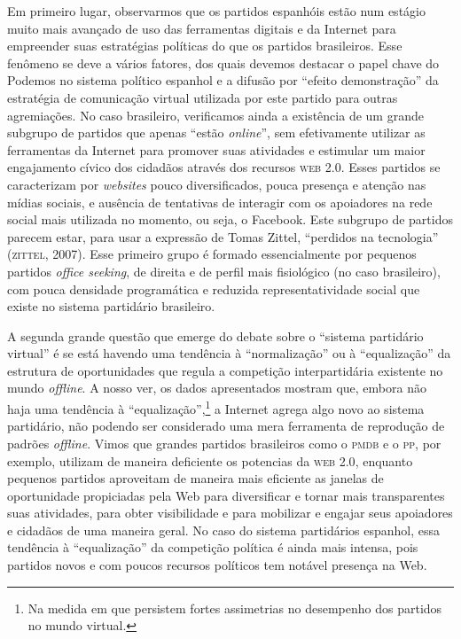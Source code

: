 Em primeiro lugar, observarmos que os partidos espanhóis estão num
estágio muito mais avançado de uso das ferramentas digitais e da
Internet para empreender suas estratégias políticas do que os partidos
brasileiros. Esse fenômeno se deve a vários fatores, dos quais devemos
destacar o papel chave do Podemos no sistema político espanhol e
a difusão por ``efeito demonstração'' da estratégia de comunicação
virtual utilizada por este partido para outras agremiações. No caso
brasileiro, verificamos ainda a existência de um grande subgrupo de
partidos que apenas ``estão \textit{online}'', sem efetivamente utilizar as
ferramentas da Internet para promover suas atividades e estimular um
maior engajamento cívico dos cidadãos através dos recursos \textsc{web 2.0}.
Esses partidos se caracterizam por \textit{websites} pouco diversificados, pouca
presença e atenção nas mídias sociais, e ausência de tentativas de
interagir com os apoiadores na rede social mais utilizada no momento, ou
seja, o Facebook. Este subgrupo de partidos parecem estar, para usar a
expressão de Tomas Zittel, ``perdidos na tecnologia'' (\textsc{zittel}, 2007).
Esse primeiro grupo é formado essencialmente por pequenos partidos
\textit{office seeking}, de direita e de perfil mais fisiológico (no caso
brasileiro), com pouca densidade programática e reduzida
representatividade social que existe no sistema partidário brasileiro.

A segunda grande questão que emerge do debate sobre o ``sistema
partidário virtual'' é se está havendo uma tendência à ``normalização''
ou à ``equalização'' da estrutura de oportunidades que regula a
competição interpartidária existente no mundo \textit{offline}. A nosso ver, os
dados apresentados mostram que, embora não haja uma tendência à
``equalização'',\footnote{Na medida em que persistem fortes assimetrias no
desempenho dos partidos no mundo virtual.} a Internet agrega algo novo
ao sistema partidário, não podendo ser considerado uma mera ferramenta
de reprodução de padrões \textit{offline}. Vimos que grandes partidos
brasileiros como o \textsc{pmdb} e o \textsc{pp}, por exemplo, utilizam de maneira
deficiente os potencias da \textsc{web 2.0}, enquanto pequenos partidos
aproveitam de maneira mais eficiente as janelas de oportunidade
propiciadas pela Web para diversificar e tornar mais transparentes suas
atividades, para obter visibilidade e para mobilizar e engajar seus
apoiadores e cidadãos de uma maneira geral. No caso do sistema
partidários espanhol, essa tendência à ``equalização'' da competição
política é ainda mais intensa, pois partidos novos e com poucos recursos
políticos tem notável presença na Web.

